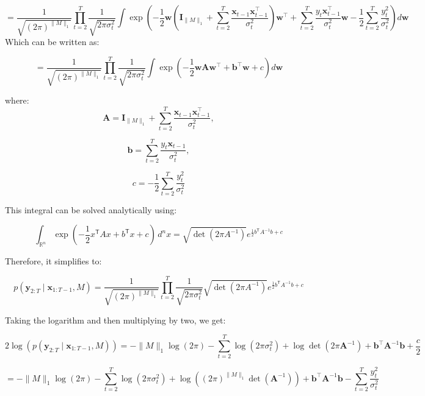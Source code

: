 \documentclass{article}
\begin{document}
\[
= 
\frac{1}{\sqrt{(2\pi)^{\|M\|_1} }} 
\prod_{t=2}^T \frac{1}{\sqrt{2\pi \sigma_t^2}} 
\int 
\exp\left(
-\frac{1}{2}
\mathbf{w}
\left(\boldsymbol{I}_{\|M\|_1} + \sum_{t=2}^T \frac{\boldsymbol{x}_{t-1} \boldsymbol{x}_{t-1}^\top}{\sigma_t^2} \right)
\mathbf{w}^\top
+ \sum_{t=2}^T \frac{{y}_{t} \boldsymbol{x}_{t-1}^\top}{\sigma_t^2} 
\mathbf{w}
- \frac{1}{2} \sum_{t=2}^T \frac{{y}_{t}^2}{\sigma_t^2} 
\right)
d\boldsymbol{w}
\]
Which can be written as:

\[
= 
\frac{1}{\sqrt{(2\pi)^{\|M\|_1} }} 
\prod_{t=2}^T \frac{1}{\sqrt{2\pi \sigma_t^2}} 
\int 
\exp\left(
-\frac{1}{2}
\mathbf{w}
\boldsymbol{A}
\mathbf{w}^\top
+ \boldsymbol{b}^\top
\mathbf{w}
+ c
\right)
d\boldsymbol{w}
\]

where:
\[
\boldsymbol{A} = \boldsymbol{I}_{\|M\|_1} + \sum_{t=2}^T \frac{\boldsymbol{x}_{t-1} \boldsymbol{x}_{t-1}^\top}{\sigma_t^2} ,
\]

\[
\boldsymbol{b} = \sum_{t=2}^T \frac{{y}_{t} \boldsymbol{x}_{t-1}}{\sigma_t^2} ,
\]

\[
{c} = - \frac{1}{2} \sum_{t=2}^T \frac{{y}_{t}^2}{\sigma_t^2} 
\]

This integral can be solved analytically using:

\[
 \int _{\mathbb {R} ^{n}}\exp {\left(-{\frac {1}{2}}x^{\mathsf {T}}Ax+b^{\mathsf {T}}x+c\right)}\,d^{n}x
 ={\sqrt {\det(2\pi A^{-1})}}e^{{\frac {1}{2}}b^{\mathsf {T}}A^{-1}b+c}
\]

Therefore, it simplifies to:

\[
p(\boldsymbol{y}_{2:T} \mid \boldsymbol{x}_{1:T-1}, M) = 
\frac{1}{\sqrt{(2\pi)^{\|M\|_1} }} 
\prod_{t=2}^T \frac{1}{\sqrt{2\pi \sigma_t^2}} 
{\sqrt {\det(2\pi A^{-1})}}e^{{\frac {1}{2}}b^{\mathsf {T}}A^{-1}b+c}
\]

Taking the logarithm and then multiplying by two, we get:


\[
2 \log ( p(\boldsymbol{y}_{2:T} \mid \boldsymbol{x}_{1:T-1}, M)) = 
% 
- {\|M\|_1}\log(2\pi) 
- \sum_{t=2}^T \log(2\pi \sigma_t^2)
+ \log \det(2\pi \boldsymbol{A}^{-1}) 
+ \boldsymbol{b}^\top \boldsymbol{A}^{-1} \boldsymbol{b} 
+ \frac{c}{2}
\]


\[
= 
- {\|M\|_1}\log(2\pi) 
- \sum_{t=2}^T \log(2\pi \sigma_t^2)
+ \log \left( (2\pi)^{\|M\|_1} \det( \boldsymbol{A}^{-1}) \right)
+ \boldsymbol{b}^\top \boldsymbol{A}^{-1} \boldsymbol{b} 
- \sum_{t=2}^T \frac{y_t^2}{\sigma_t^2} 
\]
\end{document}
